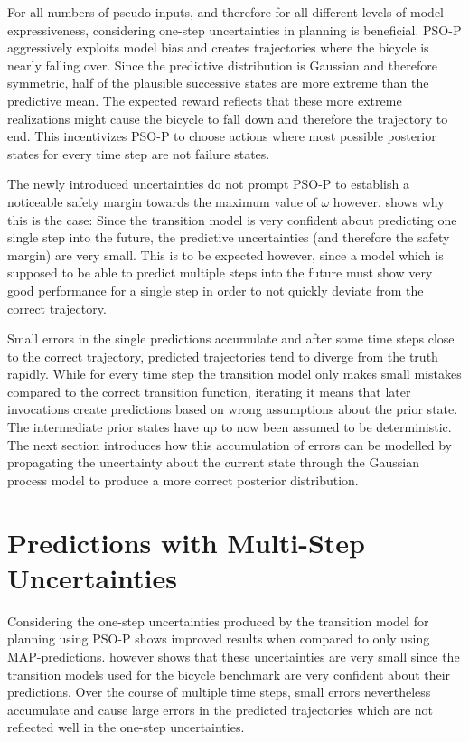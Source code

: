 For all numbers of pseudo inputs, and therefore for all different levels of model expressiveness, considering one-step uncertainties in planning is beneficial.
PSO-P aggressively exploits model bias and creates trajectories where the bicycle is nearly falling over.
Since the predictive distribution is Gaussian and therefore symmetric, half of the plausible successive states are more extreme than the predictive mean.
The expected reward reflects that these more extreme realizations might cause the bicycle to fall down and therefore the trajectory to end.
This incentivizes PSO-P to choose actions where most possible posterior states for every time step are not failure states.

The newly introduced uncertainties do not prompt PSO-P to establish a noticeable safety margin towards the maximum value of $\omega$ however.
 shows why this is the case:
Since the transition model is very confident about predicting one single step into the future, the predictive uncertainties (and therefore the safety margin) are very small.
This is to be expected however, since a model which is supposed to be able to predict multiple steps into the future must show very good performance for a single step in order to not quickly deviate from the correct trajectory.

Small errors in the single predictions accumulate and after some time steps close to the correct trajectory, predicted trajectories tend to diverge from the truth rapidly.
While for every time step the transition model only makes small mistakes compared to the correct transition function, iterating it means that later invocations create predictions based on wrong assumptions about the prior state.
The intermediate prior states have up to now been assumed to be deterministic.
The next section introduces how this accumulation of errors can be modelled by propagating the uncertainty about the current state through the Gaussian process model to produce a more correct posterior distribution.

\section{Predictions with Multi-Step Uncertainties}
\label{sub:ms_predictions}
Considering the one-step uncertainties produced by the transition model for planning using PSO-P shows improved results when compared to only using MAP-predictions.
 however shows that these uncertainties are very small since the transition models used for the bicycle benchmark are very confident about their predictions.
Over the course of multiple time steps, small errors nevertheless accumulate and cause large errors in the predicted trajectories which are not reflected well in the one-step uncertainties.

